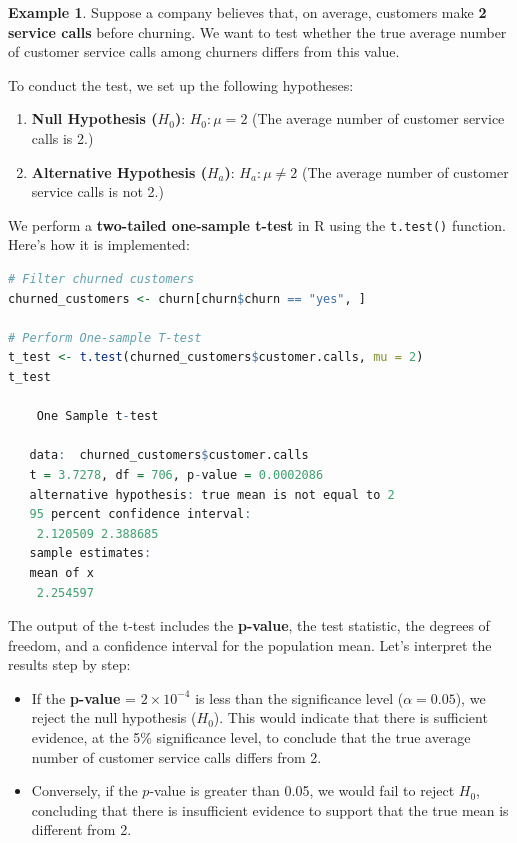 \documentclass[
]{book}
\newcommand{\passthrough}[1]{#1}
\providecommand{\tightlist}{%
  \setlength{\itemsep}{0pt}\setlength{\parskip}{0pt}}
\theoremstyle{definition}
\theoremstyle{definition}
\newtheorem{example}{Example}[chapter]
\theoremstyle{definition}
\theoremstyle{definition}
\theoremstyle{remark}
\begin{document}
\begin{example}
\protect\hypertarget{exm:ex-one-sample-test}{}\label{exm:ex-one-sample-test}Suppose a company believes that, on average, customers make \textbf{2 service calls} before churning. We want to test whether the true average number of customer service calls among churners differs from this value.

To conduct the test, we set up the following hypotheses:

\begin{enumerate}
\def\labelenumi{\arabic{enumi}.}
\tightlist
\item
  \textbf{Null Hypothesis (\(H_0\))}: \(H_0: \mu = 2\) (The average number of customer service calls is 2.)\\
\item
  \textbf{Alternative Hypothesis (\(H_a\))}: \(H_a: \mu \neq 2\) (The average number of customer service calls is not 2.)
\end{enumerate}

We perform a \textbf{two-tailed one-sample t-test} in R using the \passthrough{\lstinline!t.test()!} function. Here's how it is implemented:

\begin{lstlisting}[language=R]
# Filter churned customers
churned_customers <- churn[churn$churn == "yes", ]

# Perform One-sample T-test
t_test <- t.test(churned_customers$customer.calls, mu = 2)
t_test
   
    One Sample t-test
   
   data:  churned_customers$customer.calls
   t = 3.7278, df = 706, p-value = 0.0002086
   alternative hypothesis: true mean is not equal to 2
   95 percent confidence interval:
    2.120509 2.388685
   sample estimates:
   mean of x 
    2.254597
\end{lstlisting}

The output of the t-test includes the \textbf{p-value}, the test statistic, the degrees of freedom, and a confidence interval for the population mean. Let's interpret the results step by step:

\begin{itemize}
\tightlist
\item
  If the \textbf{p-value} = \ensuremath{2\times 10^{-4}} is less than the significance level (\(\alpha = 0.05\)), we reject the null hypothesis (\(H_0\)). This would indicate that there is sufficient evidence, at the 5\% significance level, to conclude that the true average number of customer service calls differs from 2.\\
\item
  Conversely, if the \(p\)-value is greater than 0.05, we would fail to reject \(H_0\), concluding that there is insufficient evidence to support that the true mean is different from 2.
\end{itemize}


\end{example}
\end{document}

